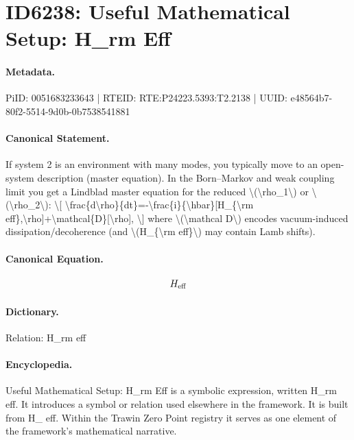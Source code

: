 \section*{ID6238: Useful Mathematical Setup: H\_rm Eff}
\paragraph{Metadata.}
PiID: 0051683233643 | RTEID: RTE:P24223.5393:T2.2138 | UUID: e48564b7-80f2-5514-9d0b-0b7538541881

\paragraph{Canonical Statement.}
If system 2 is an environment with many modes, you typically move to an open-system description (master equation). In the Born–Markov and weak coupling limit you get a Lindblad master equation for the reduced \textbackslash{}(\textbackslash{}rho\_1\textbackslash{}) or \textbackslash{}(\textbackslash{}rho\_2\textbackslash{}): \textbackslash{}[ \textbackslash{}frac\{d\textbackslash{}rho\}\{dt\}=-\textbackslash{}frac\{i\}\{\textbackslash{}hbar\}[H\_\{\textbackslash{}rm eff\},\textbackslash{}rho]+\textbackslash{}mathcal\{D\}[\textbackslash{}rho], \textbackslash{}] where \textbackslash{}(\textbackslash{}mathcal D\textbackslash{}) encodes vacuum-induced dissipation/decoherence (and \textbackslash{}(H\_\{\textbackslash{}rm eff\}\textbackslash{}) may contain Lamb shifts).

\paragraph{Canonical Equation.}
\[
H_{\rm eff}
\]

\paragraph{Dictionary.}
Relation: H\_rm eff

\paragraph{Encyclopedia.}
Useful Mathematical Setup: H\_rm Eff is a symbolic expression, written H\_rm eff. It introduces a symbol or relation used elsewhere in the framework. It is built from H\_ eff. Within the Trawin Zero Point registry it serves as one element of the framework's mathematical narrative.
